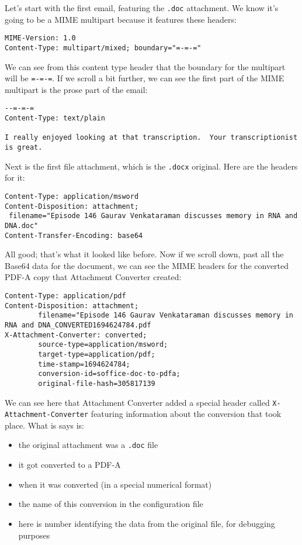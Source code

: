 \documentclass[11pt]{article}
\begin{document}
Let's start with the first email, featuring the \texttt{.doc} attachment.  We
know it's going to be a MIME multipart because it features these
headers:

\begin{verbatim}
MIME-Version: 1.0
Content-Type: multipart/mixed; boundary="=-=-="
\end{verbatim}

We can see from this content type header that the boundary for the
multipart will be \texttt{=-=-=}. If we scroll a bit further, we can see the
first part of the MIME multipart is the prose part of the email:

\begin{verbatim}
--=-=-=
Content-Type: text/plain

I really enjoyed looking at that transcription.  Your transcriptionist
is great.
\end{verbatim}

Next is the first file attachment, which is the \texttt{.docx} original.
Here are the headers for it:

\begin{verbatim}
Content-Type: application/msword
Content-Disposition: attachment;
 filename="Episode 146 Gaurav Venkataraman discusses memory in RNA and DNA.doc"
Content-Transfer-Encoding: base64
\end{verbatim}

All good; that's what it looked like before.  Now if we scroll down,
past all the Base64 data for the document, we can see the MIME headers
for the converted PDF-A copy that Attachment Converter created:

\footnotesize

\begin{verbatim}
Content-Type: application/pdf
Content-Disposition: attachment;
        filename="Episode 146 Gaurav Venkataraman discusses memory in RNA and DNA_CONVERTED1694624784.pdf
X-Attachment-Converter: converted;
        source-type=application/msword;
        target-type=application/pdf;
        time-stamp=1694624784;
        conversion-id=soffice-doc-to-pdfa;
        original-file-hash=305817139
\end{verbatim}

\normalsize

We can see here that Attachment Converter added a special header
called \texttt{X-Attachment-Converter} featuring information about the
conversion that took place.  What is says is:

\begin{itemize}
\item the original attachment was a \texttt{.doc} file
\item it got converted to a PDF-A
\item when it was converted (in a special numerical format)
\item the name of this conversion in the configuration file
\item here is number identifying the data from the
original file, for debugging purposes
\end{itemize}
\end{document}
